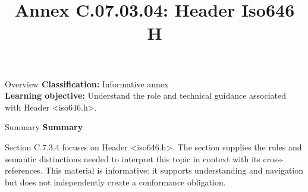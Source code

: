 \documentclass[10pt,letterpaper]{article}
\title{Annex C.07.03.04: Header Iso646 H}
\author{}
\date{}
\begin{document}
\maketitle
\begin{CornellOverviewBox}{Overview}
\textbf{Classification:} Informative annex\\[2pt]
\textbf{Learning objective:} Understand the role and technical guidance associated with Header <iso646.h>.
\end{CornellOverviewBox}\begin{CornellSummaryBox}{Summary}
{\sffamily\bfseries\color{Accent} Summary}\par\vspace{3pt}Section C.7.3.4 focuses on Header <iso646.h>. The section supplies the rules and semantic distinctions needed to interpret this topic in context with its cross-references. This material is informative: it supports understanding and navigation but does not independently create a conformance obligation.
\end{CornellSummaryBox}
\end{document}
